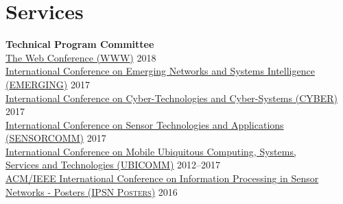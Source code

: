 
\section{\sc Services}
{\bf Technical Program Committee}\\
{\href{https://www2018.thewebconf.org/}{The Web Conference (\textsc{WWW})}} \hfill 2018\\
{\href{http://www.iaria.org/conferences2017/EMERGING17.html}{International Conference on Emerging Networks and Systems Intelligence (\textsc{EMERGING})}} \hfill 2017\\
{\href{http://www.iaria.org/conferences2017/CYBER17.html}{International Conference on Cyber-Technologies and Cyber-Systems (\textsc{CYBER})}} \hfill 2017\\
{\href{http://www.iaria.org/conferences2017/SENSORCOMM17.html}{International Conference on Sensor Technologies and Applications (\textsc{SENSORCOMM})}} \hfill 2017\\
{\href{http://www.iaria.org/conferences2017/UBICOMM17.html}{International Conference on Mobile Ubiquitous Computing, Systems,\\ Services and Technologies (\textsc{UBICOMM})}} \hfill 2012--2017\\
{\href{http://ipsn.acm.org/2016/posters.html}{ACM/IEEE International Conference on Information Processing in Sensor\\Networks - Posters (\textsc{IPSN Posters})}} \hfill 2016\\
\vspace{-0.6cm}

